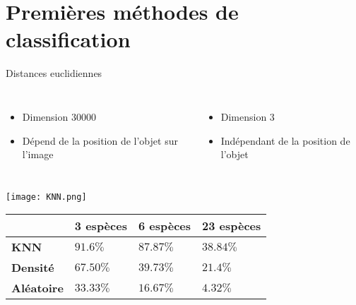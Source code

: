 \documentclass{falconbeamer}
\begin{document}
\section{Premières méthodes de classification}

\begin{frame}{Distances euclidiennes}
	\begin{columns}[T]
		\begin{itemize}
			\item Dimension $30 000$
			\item Dépend de la position de l'objet sur l'image
		\end{itemize}
		
		\begin{itemize}
			\item Dimension $3$
			\item Indépendant de la position de l'objet
		\end{itemize}
	\end{columns}
	
	\begin{center}
		\texttt{[image: KNN.png]}
		
		\begin{tabular}{ |m{6.5em}|m{6.5em}|m{6.5em}|m{6.5em}| }
			\hline
			& \textbf{3 espèces} & \textbf{6 espèces} &  \textbf{23 espèces} \\
			\hline\smallskip
			\textbf{KNN} & $91.6\%$ & $87.87\%$ & $38.84\%$ \\\smallskip
			\textbf{Densité} & $67.50\%$ & $39.73\%$ & $21.4\%$ \\\smallskip
			\textbf{Aléatoire} & $33.33\%$ & $16.67\%$ & $4.32\%$ \\
			\hline
		\end{tabular}
	\end{center}
	
\end{frame}
\end{document}
